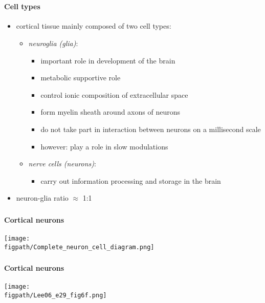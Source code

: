 \documentclass[8pt,t,usepdftitle=false]{beamer}
\def\figpath{\src/figures}
\begin{document}
\section{\ttl}
\begin{frame}[plain]
  \frametitle{\ttl}
  \framesubtitle{Cell types}
  \begin{itemize}\itemsep1ex
  \item cortical tissue mainly composed of two cell types:
    \begin{itemize}\itemsep1ex
    \item \emph{neuroglia (glia)}:
      \begin{itemize}\itemsep1ex
      \item important role in development of the brain
      \item metabolic supportive role
      \item control ionic composition of extracellular space
      \item form myelin sheath around axons of neurons
      \item do not take part in interaction between neurons on a millisecond scale
      \item however: play a role in slow modulations
      \end{itemize}
    \item \emph{nerve cells (neurons)}:
      \begin{itemize}\itemsep1ex
      \item carry out information processing and storage in the brain
      \end{itemize}
    \end{itemize}
  \item neuron-glia ratio $\approx$ 1:1 
  \end{itemize}
\end{frame}
\begin{frame}[plain]
  \frametitle{\ttl}
  \framesubtitle{Cortical neurons}
  \begin{center}
  \parbox{0.85\linewidth}{
    \texttt{[image: \\figpath/Complete\_neuron\_cell\_diagram.png]}
    \hspace*{\fill}\tiny\color{gray}{(Wikipedia)}
  }    
  \end{center}
\end{frame}
\begin{frame}[plain]
  \frametitle{\ttl}
  \framesubtitle{Cortical neurons}
  \begin{center}
    \vspace*{-2ex}
  \parbox{0.8\linewidth}{
    \texttt{[image: \\figpath/Lee06\_e29\_fig6f.png]}\\[1ex]
    \hspace*{\fill}\tiny{}
  }    
  \end{center}
\end{frame}
\end{document}
